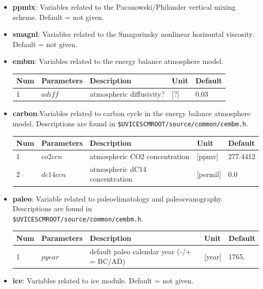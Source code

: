 \documentclass[a4paper]{article}
\begin{document}
\begin{itemize}
\item \textbf{ppmix}: Variables related to the Pacanowski/Philander vertical mixing scheme. Default = not given.
\item \textbf{smagnl}: Variables related to the Smagorinsky nonlinear horizontal viscosity. Default = not given.
\item \textbf{embm}: Variables related to the energy balance atmosphere model.
{\footnotesize
\begin{longtable}{lllll} \hline
  Num  & Parameters                       & Description                                   & Unit                          & Default    \\ \hline 
  1    & $adiff$                          & atmospheric diffusivity?                      & [?]                           & 0.03       \\ \hline
   \end{longtable}}
\item \textbf{carbon}:Variables related to carbon cycle in the energy balance atmosphere model. Descriptions are found in \verb|$UVICESCMROOT/source/common/cembm.h|.
{\footnotesize
\begin{longtable}{lllll} \hline
  Num  & Parameters                       & Description                                   & Unit                          & Default    \\ \hline 
  1    & $co2ccn$                         & atmospheric CO2 concentration                 & [ppmv]                        & 277.4412   \\
  2    & $dc14ccn$                        & atmospheric dC14 concentration                & [permil]                      & 0.0        \\ \hline
   \end{longtable}}
\item \textbf{paleo}: Variable related to paleoclimatology and paleoceanography. Descriptions are found in \\ \verb|$UVICESCMROOT/source/common/cembm.h|.
{\footnotesize
\begin{longtable}{lllll} \hline
  Num  & Parameters                       & Description                                   & Unit                          & Default    \\ \hline 
  1    & $pyear$                          & default paleo calendar year (-/+ = BC/AD)     & [year]                        & 1765.       \\ \hline
   \end{longtable}}
\item \textbf{ice}:  Variables related to ice module. Default = not given.

\end{itemize}
\end{document}
